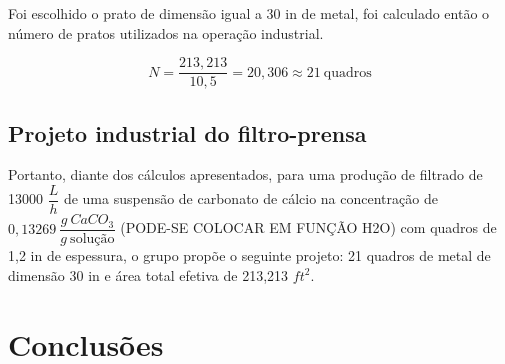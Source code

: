 Foi escolhido o prato de dimensão igual a 30 in de metal, foi calculado então o número de pratos utilizados na operação industrial.



\begin{equation}\label{key}
N=\frac{213,213}{10,5}= 20,306 \approx 21 \ \text{quadros}
\end{equation}

\section{Projeto industrial do filtro-prensa}


Portanto, diante dos cálculos apresentados, para uma produção de filtrado de 13000 $ \dfrac{L}{h} $ de uma suspensão de carbonato de cálcio na concentração de $ 0,13269 \ \dfrac{g \ CaCO_{3}}{g \ \text{solução}}$ (PODE-SE COLOCAR EM FUNÇÃO H2O) com quadros de 1,2
in de espessura, o grupo propõe o seguinte projeto: 21 quadros de metal de dimensão 30 in e área total efetiva de 213,213 $ ft^{2} $.



\chapter{Conclusões}
